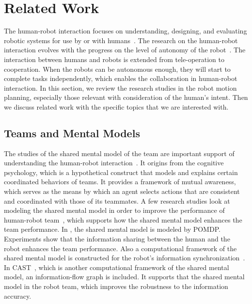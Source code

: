 \documentclass[phd]{byuprop}
\begin{document}
\section{Related Work}

The human-robot interaction focuses on understanding, designing, and evaluating robotic systems for use by or with humans~\cite{goodrich2007human}.
The research on the human-robot interaction evolves with the progress on the level of autonomy of the robot~\cite{goodrich2007human}.
The interaction between humans and robots is extended from tele-operation to cooperation.
When the robots can be autonomous enough, they will start to complete tasks independently,
which enables the collaboration in human-robot interaction.
In this section, we review the research studies in the robot motion planning, especially those relevant with consideration of the human's intent.
Then we discuss related work with the specific topics that we are interested with.

\subsection{Teams and Mental Models}

The studies of the shared mental model of the team are important support of understanding the human-robot interaction~\cite{FSS149109}.
It origins from the cognitive psychology, which is a hypothetical construct that models and explains certain coordinated behaviors of teams.
It provides a framework of mutual awareness, which serves as the means by which an agent selects actions that are consistent and coordinated with those of its teammates.
A few research studies look at modeling the shared mental model in order to improve the performance of human-robot team~\cite{nikolaidis2012human,Yen_implementingshared,FSS149109,Jonker:2010:SMM:2018118.2018128,Neerincx2011,Mathieu2000,Kennedy2007}, which supports how the shared mental model enhances the team performance.
In \cite{nikolaidis2012human}, the shared mental model is modeled by POMDP. 
Experiments show that the information sharing between the human and the robot enhances the team performance.
Also a computational framework of the shared mental model is constructed for the robot's information synchronization~\cite{FSS149109}.
In CAST~\cite{FSS149109}, which is another computational framework of the shared mental model, an information-flow graph is included. 
It supports that the shared mental model in the robot team, which improves the robustness to the information accuracy.
\end{document}
